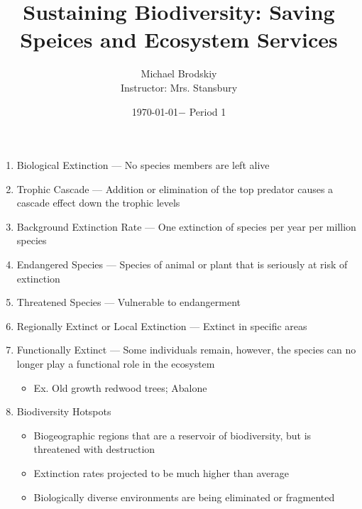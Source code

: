 \documentclass[12pt]{article}
\title{Sustaining Biodiversity: Saving Speices and Ecosystem Services}
\date{\today $-$ Period 1}
\author{Michael Brodskiy\\ \small Instructor: Mrs. Stansbury}
\begin{document}
\maketitle

\begin{enumerate}

  \item Biological Extinction — No species members are left alive

  \item Trophic Cascade — Addition or elimination of the top predator causes a cascade effect down the trophic levels

  \item Background Extinction Rate — One extinction of species per year per million species

  \item Endangered Species — Species of animal or plant that is seriously at risk of extinction

  \item Threatened Species — Vulnerable to endangerment

  \item Regionally Extinct or Local Extinction — Extinct in specific areas

  \item Functionally Extinct — Some individuals remain, however, the species can no longer play a functional role in the ecosystem

    \begin{itemize}

      \item Ex. Old growth redwood trees; Abalone

    \end{itemize}

  \item Biodiversity Hotspots

    \begin{itemize}

      \item Biogeographic regions that are a reservoir of biodiversity, but is threatened with destruction

      \item Extinction rates projected to be much higher than average

      \item Biologically diverse environments are being eliminated or fragmented

    \end{itemize}


\end{enumerate}
\end{document}

